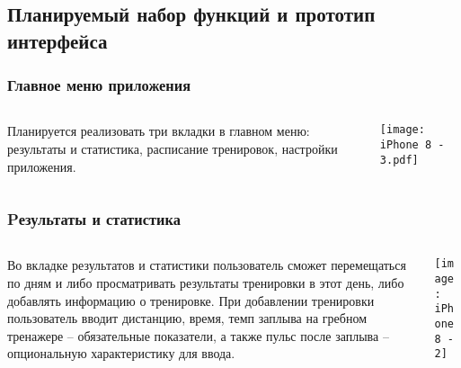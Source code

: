 \documentclass[10pt,utf8,presentation,notheorems,xcolor=dvipsnames,compress]{beamer}
\begin{document}
\subsection{Планируемый набор функций и прототип интерфейса}

\begin{frame}
\frametitle{Главное меню приложения}

\begin{columns}[c]

\begin{column}{.5\textwidth}
Планируется реализовать три вкладки в главном меню: результаты и статистика, расписание тренировок, настройки приложения.
\end{column}

\begin{column}{.5\textwidth}
\begin{center}
\texttt{[image: iPhone 8 - 3.pdf]}%
\end{center}
\end{column}

\end{columns}
\end{frame}

\begin{frame}
\frametitle{Pезультаты и статистика}

\begin{columns}[c]

\begin{column}{.5\textwidth}
Во вкладке результатов и статистики пользователь сможет перемещаться по дням и
либо просматривать результаты тренировки в этот день, либо добавлять
информацию о тренировке. При добавлении тренировки пользователь вводит дистанцию, время, темп заплыва на гребном тренажере – обязательные
показатели, а также пульс после заплыва – опциональную характеристику
для ввода. 
\end{column}

\begin{column}{.5\textwidth}
\begin{center}
\texttt{[image: iPhone 8 - 2]}%
\end{center}
\end{column}

\end{columns}
\end{frame}
\end{document}
